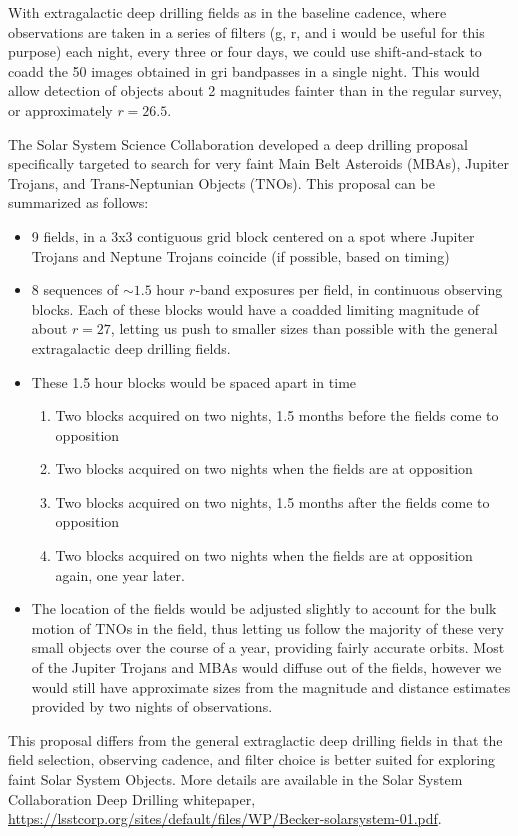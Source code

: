 With extragalactic deep drilling fields as in the baseline cadence,
where observations are taken in a series of filters (g, r, and i
would be useful for this purpose) each night, every three or four
days, we could use shift-and-stack to coadd the 50 images obtained in
gri bandpasses in a single night. This would allow detection of
objects about 2 magnitudes fainter than in the regular survey, or
approximately $r=26.5$.

The Solar System Science Collaboration developed a deep drilling
proposal specifically targeted to search for very faint Main Belt
Asteroids (MBAs),  Jupiter Trojans,
and Trans-Neptunian Objects (TNOs). This proposal can be summarized as
follows:
\begin{itemize}
\item 9 fields, in a 3x3 contiguous grid block centered on a spot
  where Jupiter Trojans and Neptune Trojans coincide (if possible,
  based on timing)
\item 8 sequences of $\sim1.5$ hour $r$-band exposures per field, in continuous
  observing blocks. Each of these blocks would have a coadded limiting
  magnitude of about $r=27$, letting us push to smaller sizes than
  possible with the general extragalactic deep drilling fields.
\item These 1.5 hour blocks would be spaced apart in time
   \begin{enumerate}
   \item Two blocks acquired on two nights, 1.5 months before the fields come to
     opposition
  \item  Two blocks acquired on two nights when the fields are at
    opposition
  \item Two blocks acquired on two nights, 1.5 months after the fields
    come to opposition
  \item Two blocks acquired on two nights when the fields are at
    opposition again, one year later. 
 \end{enumerate}
\item The location of the fields would be adjusted slightly to account
  for the bulk motion of TNOs in the field, thus letting us follow the
  majority of these very small objects over the course of a year,
  providing fairly accurate orbits. Most of the Jupiter Trojans and
  MBAs would diffuse out of the fields, however we would still have
  approximate sizes from the magnitude and distance estimates provided
  by two nights of observations. 
\end{itemize}

This proposal differs from the general extraglactic deep drilling
fields in that the field selection, observing cadence, and filter
choice is better suited for exploring faint Solar System Objects. More
details are available in the Solar System Collaboration Deep Drilling
whitepaper, \url{https://lsstcorp.org/sites/default/files/WP/Becker-solarsystem-01.pdf}.




\navigationbar
